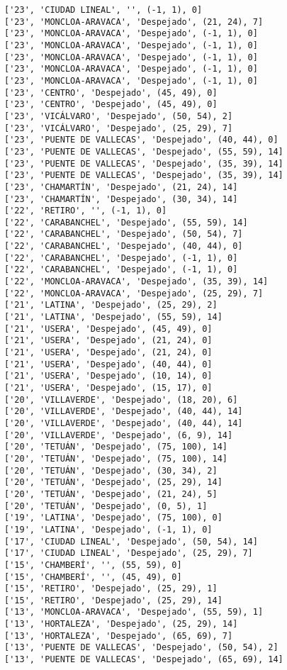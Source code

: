 \documentclass[11pt]{article}
\begin{document}
\begin{Verbatim}[commandchars=\\\{\}]
['23', 'CIUDAD LINEAL', '', (-1, 1), 0]
['23', 'MONCLOA-ARAVACA', 'Despejado', (21, 24), 7]
['23', 'MONCLOA-ARAVACA', 'Despejado', (-1, 1), 0]
['23', 'MONCLOA-ARAVACA', 'Despejado', (-1, 1), 0]
['23', 'MONCLOA-ARAVACA', 'Despejado', (-1, 1), 0]
['23', 'MONCLOA-ARAVACA', 'Despejado', (-1, 1), 0]
['23', 'MONCLOA-ARAVACA', 'Despejado', (-1, 1), 0]
['23', 'CENTRO', 'Despejado', (45, 49), 0]
['23', 'CENTRO', 'Despejado', (45, 49), 0]
['23', 'VICÁLVARO', 'Despejado', (50, 54), 2]
['23', 'VICÁLVARO', 'Despejado', (25, 29), 7]
['23', 'PUENTE DE VALLECAS', 'Despejado', (40, 44), 0]
['23', 'PUENTE DE VALLECAS', 'Despejado', (55, 59), 14]
['23', 'PUENTE DE VALLECAS', 'Despejado', (35, 39), 14]
['23', 'PUENTE DE VALLECAS', 'Despejado', (35, 39), 14]
['23', 'CHAMARTÍN', 'Despejado', (21, 24), 14]
['23', 'CHAMARTÍN', 'Despejado', (30, 34), 14]
['22', 'RETIRO', '', (-1, 1), 0]
['22', 'CARABANCHEL', 'Despejado', (55, 59), 14]
['22', 'CARABANCHEL', 'Despejado', (50, 54), 7]
['22', 'CARABANCHEL', 'Despejado', (40, 44), 0]
['22', 'CARABANCHEL', 'Despejado', (-1, 1), 0]
['22', 'CARABANCHEL', 'Despejado', (-1, 1), 0]
['22', 'MONCLOA-ARAVACA', 'Despejado', (35, 39), 14]
['22', 'MONCLOA-ARAVACA', 'Despejado', (25, 29), 7]
['21', 'LATINA', 'Despejado', (25, 29), 2]
['21', 'LATINA', 'Despejado', (55, 59), 14]
['21', 'USERA', 'Despejado', (45, 49), 0]
['21', 'USERA', 'Despejado', (21, 24), 0]
['21', 'USERA', 'Despejado', (21, 24), 0]
['21', 'USERA', 'Despejado', (40, 44), 0]
['21', 'USERA', 'Despejado', (10, 14), 0]
['21', 'USERA', 'Despejado', (15, 17), 0]
['20', 'VILLAVERDE', 'Despejado', (18, 20), 6]
['20', 'VILLAVERDE', 'Despejado', (40, 44), 14]
['20', 'VILLAVERDE', 'Despejado', (40, 44), 14]
['20', 'VILLAVERDE', 'Despejado', (6, 9), 14]
['20', 'TETUÁN', 'Despejado', (75, 100), 14]
['20', 'TETUÁN', 'Despejado', (75, 100), 14]
['20', 'TETUÁN', 'Despejado', (30, 34), 2]
['20', 'TETUÁN', 'Despejado', (25, 29), 14]
['20', 'TETUÁN', 'Despejado', (21, 24), 5]
['20', 'TETUÁN', 'Despejado', (0, 5), 1]
['19', 'LATINA', 'Despejado', (75, 100), 0]
['19', 'LATINA', 'Despejado', (-1, 1), 0]
['17', 'CIUDAD LINEAL', 'Despejado', (50, 54), 14]
['17', 'CIUDAD LINEAL', 'Despejado', (25, 29), 7]
['15', 'CHAMBERÍ', '', (55, 59), 0]
['15', 'CHAMBERÍ', '', (45, 49), 0]
['15', 'RETIRO', 'Despejado', (25, 29), 1]
['15', 'RETIRO', 'Despejado', (25, 29), 14]
['13', 'MONCLOA-ARAVACA', 'Despejado', (55, 59), 1]
['13', 'HORTALEZA', 'Despejado', (25, 29), 14]
['13', 'HORTALEZA', 'Despejado', (65, 69), 7]
['13', 'PUENTE DE VALLECAS', 'Despejado', (50, 54), 2]
['13', 'PUENTE DE VALLECAS', 'Despejado', (65, 69), 14]

\end{Verbatim}
\end{document}
